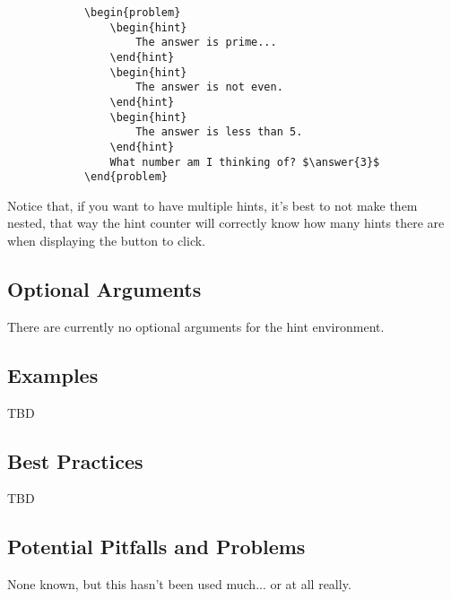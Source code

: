 \documentclass{ximera}
\begin{document}
        \begin{verbatim}
            \begin{problem}
                \begin{hint}
                    The answer is prime...
                \end{hint}
                \begin{hint}
                    The answer is not even.
                \end{hint}
                \begin{hint}
                    The answer is less than 5.
                \end{hint}
                What number am I thinking of? $\answer{3}$
            \end{problem}
        \end{verbatim}
        
        Notice that, if you want to have multiple hints, it's best to not make them nested, that way the hint counter will correctly know how many hints there are when displaying the button to click.
        
        
    \subsection*{Optional Arguments}
        
        There are currently no optional arguments for the hint environment.

    \subsection*{Examples}
    
        TBD
        
    \subsection*{Best Practices}
    
        TBD
        
    \subsection*{Potential Pitfalls and Problems}
        
        None known, but this hasn't been used much... or at all really.
\end{document}
